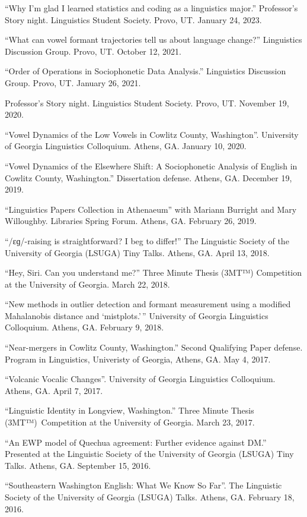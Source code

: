\documentclass[
]{article}
\begin{document}
``Why I'm glad I learned statistics and coding as a linguistics major.''
Professor's Story night. Linguistics Student Society. Provo, UT. January
24, 2023.

``What can vowel formant trajectories tell us about language change?''
Linguistics Discussion Group. Provo, UT. October 12, 2021.

``Order of Operations in Sociophonetic Data Analysis.'' Linguistics
Discussion Group. Provo, UT. January 26, 2021.

Professor's Story night. Linguistics Student Society. Provo, UT.
November 19, 2020.

``Vowel Dynamics of the Low Vowels in Cowlitz County, Washington''.
University of Georgia Linguistics Colloquium. Athens, GA. January 10,
2020.

``Vowel Dynamics of the Elsewhere Shift: A Sociophonetic Analysis of
English in Cowlitz County, Washington.'' Dissertation defense. Athens,
GA. December 19, 2019.

``Linguistics Papers Collection in Athenaeum'' with Mariann Burright and
Mary Willoughby. Libraries Spring Forum. Athens, GA. February 26, 2019.

``/ɛɡ/-raising is straightforward? I beg to differ!'' The Linguistic
Society of the University of Georgia (LSUGA) Tiny Talks. Athens, GA.
April 13, 2018.

``Hey, Siri. Can you understand me?'' Three Minute Thesis (3MT™)
Competition at the University of Georgia. March 22, 2018.

``New methods in outlier detection and formant measurement using a
modified Mahalanobis distance and `mistplots.'\,'' University of Georgia
Linguistics Colloquium. Athens, GA. February 9, 2018.

``Near-mergers in Cowlitz County, Washington.'' Second Qualifying Paper
defense. Program in Linguistics, Univeristy of Georgia, Athens, GA. May
4, 2017.

``Volcanic Vocalic Changes''. University of Georgia Linguistics
Colloquium. Athens, GA. April 7, 2017.

``Linguistic Identity in Longview, Washington.'' Three Minute Thesis
(3MT™)~Competition at the University of Georgia. March 23, 2017.

``An EWP model of Quechua agreement: Further evidence against DM.''
Presented at the Linguistic Society of the University of Georgia (LSUGA)
Tiny Talks. Athens, GA. September 15, 2016.

``Southeastern Washington English: What We Know So Far''. The Linguistic
Society of the University of Georgia (LSUGA) Talks. Athens, GA. February
18, 2016.
\end{document}
